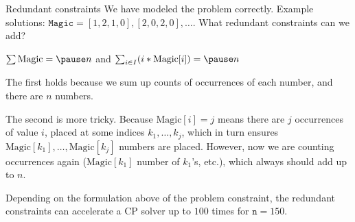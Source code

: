 \documentclass{cons-beamer}
\begin{document}
\begin{frame}{Redundant constraints}
  We have modeled the problem correctly.
  Example solutions: $\mathtt{Magic}=[1,2,1,0], [2,0,2,0], \ldots$.
  What redundant constraints can we add?
  \parBreak

   \quad $\sum \text{Magic} = \pause n$ and $\sum_{i \in I} (i \times \text{Magic}[i]) = \pause n$


  \parBreak
  The first holds because we sum up counts of occurrences of each number, and there are $n$ numbers.

  \parBreak
  The second is more tricky. Because $\text{Magic}[i] = j$ means there are $j$ occurrences of value $i$, placed at some indices $k_1, \ldots, k_j$, which in turn ensures $\text{Magic}[k_1], \ldots, \text{Magic}[k_j]$ numbers are placed.
  However, now we are counting occurrences again ($\text{Magic}[k_1]$ number of $k_1$'s, etc.), which always should add up to $n$.

  \parBreak
  Depending on the formulation above of the problem constraint, the redundant constraints can accelerate a CP solver up to $100$ times for $\mathtt{n}=150$.
\end{frame}
\end{document}
